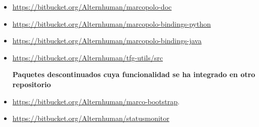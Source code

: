 \begin{itemize}[noitemsep]
\item \href{https://bitbucket.org/Alternhuman/marcopolo-doc}{https://bitbucket.org/Alternhuman/marcopolo-doc}
\item \href{https://bitbucket.org/Alternhuman/marcopolo-bindings-python}{https://bitbucket.org/Alternhuman/marcopolo-bindings-python}
\item \href{https://bitbucket.org/Alternhuman/marcopolo-bindings-java}{https://bitbucket.org/Alternhuman/marcopolo-bindings-java}
\item \href{https://bitbucket.org/Alternhuman/tfg-utils/src}{https://bitbucket.org/Alternhuman/tfg-utils/src}

\textbf{Paquetes descontinuados cuya funcionalidad se ha integrado en otro repositorio}
\item \href{https://bitbucket.org/Alternhuman/marco-bootstrap}{https://bitbucket.org/Alternhuman/marco-bootstrap}.
\item \href{https://bitbucket.org/Alternhuman/statusmonitor}{https://bitbucket.org/Alternhuman/statusmonitor}

\end{itemize}
